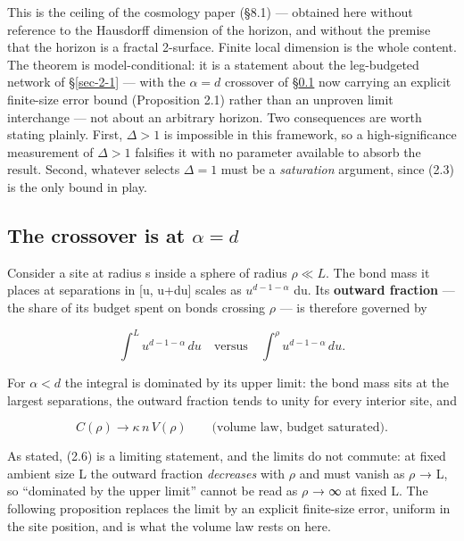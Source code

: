 \documentclass[12pt]{iopart}
\begin{document}
This is the ceiling of the cosmology paper (§8.1)
\citep{Pandev:2026cosmology} --- obtained here without reference to the
Hausdorff dimension of the horizon, and without the premise that the
horizon is a fractal 2-surface. Finite local dimension is the whole
content. The theorem is model-conditional: it is a statement about the
leg-budgeted network of §\ref{sec-2-1} --- with the \(\alpha  = d\)
crossover of §\ref{sec-2-3} now carrying an explicit finite-size error
bound (Proposition 2.1) rather than an unproven limit interchange ---
not about an arbitrary horizon. Two consequences are worth stating
plainly. First, \(\Delta  > 1\) is impossible in this framework, so a
high-significance measurement of \(\Delta  > 1\) falsifies it with no
parameter available to absorb the result. Second, whatever selects
\(\Delta  = 1\) must be a \emph{saturation} argument, since (2.3) is the
only bound in play.

\subsection{\texorpdfstring{The crossover is at
\(\alpha  = d\)}{The crossover is at \textbackslash alpha  = d}}\label{sec-2-3}

Consider a site at radius s inside a sphere of radius \(\rho  \ll  L\).
The bond mass it places at separations in {[}u, u+du{]} scales as
\(u^{d-1-\alpha }\) du. Its \textbf{outward fraction} --- the share of
its budget spent on bonds crossing \(\rho\) --- is therefore governed by

\[\int^L u^{d-1-\alpha}\,du \quad\text{versus}\quad \int^\rho u^{d-1-\alpha}\,du. \tag{2.5}\]

For \(\alpha  < d\) the integral is dominated by its upper limit: the
bond mass sits at the largest separations, the outward fraction tends to
unity for every interior site, and

\[C(\rho) \to \kappa\, n\, V(\rho) \qquad \text{(volume law, budget saturated).} \tag{2.6}\]

As stated, (2.6) is a limiting statement, and the limits do not commute:
at fixed ambient size L the outward fraction \emph{decreases} with
\(\rho\) and must vanish as \(\rho\) → L, so ``dominated by the upper
limit'' cannot be read as \(\rho\) → ∞ at fixed L. The following
proposition replaces the limit by an explicit finite-size error, uniform
in the site position, and is what the volume law rests on here.
\end{document}
